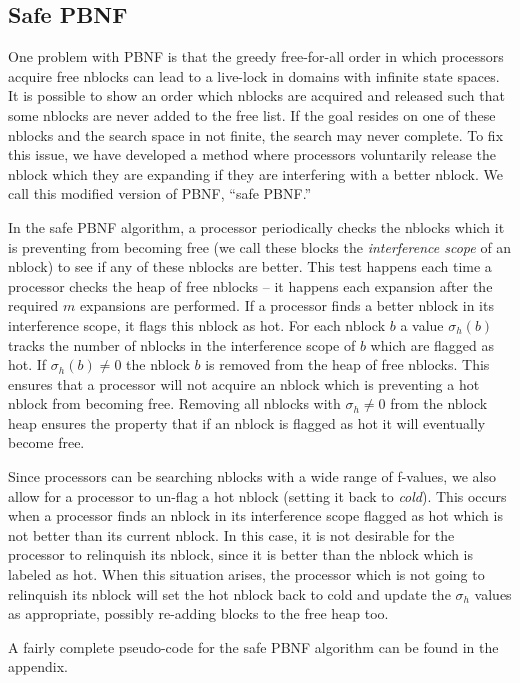 \documentclass{article}
\begin{document}
\subsection{Safe PBNF}

One problem with PBNF is that the greedy free-for-all order in which
processors acquire free nblocks can lead to a live-lock in domains
with infinite state spaces.  It is possible to show an order which
nblocks are acquired and released such that some nblocks are never
added to the free list.  If the goal resides on one of these nblocks
and the search space in not finite, the search may never complete.  To
fix this issue, we have developed a method where processors
voluntarily release the nblock which they are expanding if they are
interfering with a better nblock.  We call this modified version of
PBNF, ``safe PBNF.''

In the safe PBNF algorithm, a processor periodically checks the
nblocks which it is preventing from becoming free (we call these
blocks the \emph{interference scope} of an nblock) to see if any of
these nblocks are better.  This test happens each time a processor
checks the heap of free nblocks -- it happens each expansion after the
required $m$ expansions are performed.  If a processor finds a better
nblock in its interference scope, it flags this nblock as hot.  For
each nblock $b$ a value $\sigma_h(b)$ tracks the number of nblocks in
the interference scope of $b$ which are flagged as hot.  If
$\sigma_h(b) \neq 0$ the nblock $b$ is removed from the heap of free
nblocks.  This ensures that a processor will not acquire an nblock
which is preventing a hot nblock from becoming free.  Removing all
nblocks with $\sigma_h \neq 0$ from the nblock heap ensures the
property that if an nblock is flagged as hot it will eventually become
free.

Since processors can be searching nblocks with a wide range of
f-values, we also allow for a processor to un-flag a hot nblock
(setting it back to \emph{cold}).  This occurs when a processor finds
an nblock in its interference scope flagged as hot which is not better
than its current nblock.  In this case, it is not desirable for the
processor to relinquish its nblock, since it is better than the nblock
which is labeled as hot.  When this situation arises, the processor
which is not going to relinquish its nblock will set the hot nblock
back to cold and update the $\sigma_h$ values as appropriate, possibly
re-adding blocks to the free heap too.

A fairly complete pseudo-code for the safe PBNF algorithm can be found
in the appendix.
\end{document}
